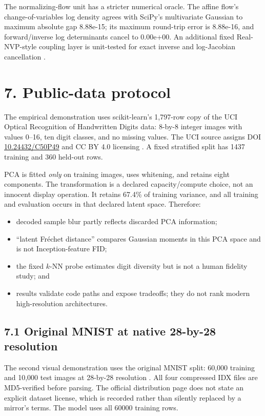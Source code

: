 \documentclass[11pt]{article}
\begin{document}
The normalizing-flow unit has a stricter numerical oracle. The affine flow's
change-of-variables log density agrees with SciPy's multivariate Gaussian to
maximum absolute gap 8.88e-15; its maximum
round-trip error is 8.88e-16, and forward/inverse
log determinants cancel to 0.00e+00. An
additional fixed Real-NVP-style coupling layer is unit-tested for exact inverse
and log-Jacobian cancellation \cite{dinh2017realnvp}.

\section*{7. Public-data protocol}

The empirical demonstration uses scikit-learn's 1,797-row copy of the UCI Optical
Recognition of Handwritten Digits data: 8-by-8 integer images with values 0--16,
ten digit classes, and no missing values. The UCI source assigns DOI
\href{https://doi.org/10.24432/C50P49}{10.24432/C50P49} and CC BY 4.0
licensing \cite{uciDigits}. A fixed stratified split has
1437 training and 360 held-out rows.

PCA is fitted \emph{only} on training images, uses whitening, and retains eight
components. The transformation is a declared capacity/compute choice, not an
innocent display operation. It retains 67.4\% of training variance,
and all training and evaluation occurs in that declared latent space. Therefore:

\begin{itemize}
\item decoded sample blur partly reflects discarded PCA information;
\item ``latent Fr\'echet distance'' compares Gaussian moments in this PCA space
and is not Inception-feature FID;
\item the fixed $k$-NN probe estimates digit diversity but is not a human fidelity
study; and
\item results validate code paths and expose tradeoffs; they do not rank modern
high-resolution architectures.
\end{itemize}


\subsection*{7.1 Original MNIST at native 28-by-28 resolution}

The second visual demonstration uses the original MNIST split: 60,000 training
and 10,000 test images at 28-by-28 resolution \cite{mnistOriginal}. All four
compressed IDX files are MD5-verified before parsing. The official distribution
page does not state an explicit dataset license, which is recorded rather than
silently replaced by a mirror's terms. The model uses all
60000 training rows.
\end{document}
